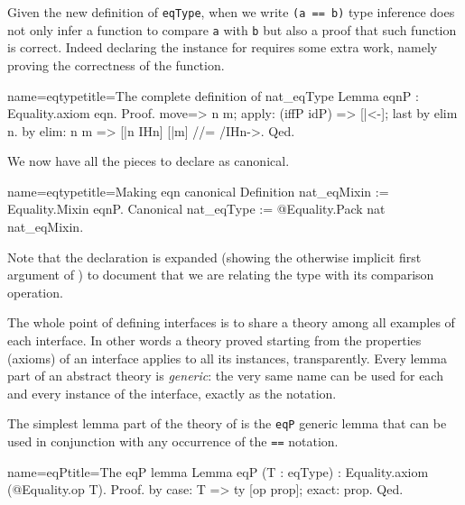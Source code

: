 Given the new definition of \lstinline/eqType/,
when we write \lstinline/(a == b)/ type inference does not only infer
a function to compare \lstinline/a/ with \lstinline/b/ but also a
proof that such function is correct.
Indeed declaring the  instance for  requires some
extra work, namely proving the correctness of the  function.

\begin{coq}{name=eqtype}{title=The complete definition of nat\_eqType}
Lemma eqnP : Equality.axiom eqn.
Proof.
move=> n m; apply: (iffP idP) => [|<-]; last by elim n.
by elim: n m => [|n IHn] [|m] //= /IHn->.
Qed.
\end{coq}

We now have all the pieces to declare  as canonical.

\begin{coq}{name=eqtype}{title=Making eqn canonical}
Definition nat_eqMixin := Equality.Mixin eqnP.
Canonical nat_eqType := @Equality.Pack nat nat_eqMixin.
\end{coq}

Note that the  declaration is expanded (showing the
otherwise implicit first argument of ) to document that
we are relating the type  with its comparison operation.

\mcbREQUIRE{}
\label{sec:eqtypetheory}

The whole point of defining interfaces is to share a theory
among all examples of each interface.
In other words a theory proved starting from the
properties (axioms) of an interface applies to all its instances,
transparently.  Every lemma part of an abstract theory
is \emph{generic}: the very same name can be used for each and every
instance of the interface, exactly as the \C{==} notation.

The simplest lemma part of the theory of  is the
\lstinline/eqP/ generic lemma that can be used in conjunction with
any occurrence of the \lstinline/==/ notation.

\begin{coq}{name=eqP}{title=The eqP lemma}
Lemma eqP (T : eqType) : Equality.axiom (@Equality.op T).
Proof. by case: T => ty [op prop]; exact: prop. Qed.
\end{coq}

